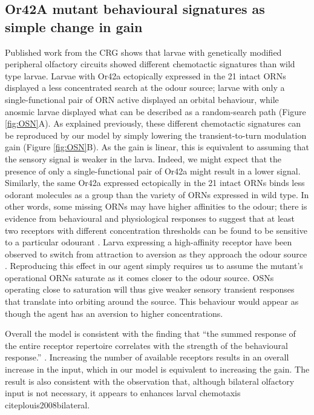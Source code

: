 \documentclass[11pt,a4paper]{article}
\begin{document}
\subsection{Or42A mutant behavioural signatures as simple change in gain}
Published work from the CRG shows that larvae with genetically modified peripheral olfactory circuits showed different chemotactic signatures than wild type larvae. Larvae with Or42a ectopically expressed in the 21 intact ORNs displayed a less concentrated search at the odour source; larvae with only a single-functional pair of ORN active displayed an orbital behaviour, while anosmic larvae displayed what can be described as a random-search path (Figure \ref{fig:OSN}A).
 As explained previously, these different chemotactic signatures can be reproduced by our model by simply lowering the transient-to-turn modulation gain 
 (Figure \ref{fig:OSN}B). As the gain is linear, this is equivalent to assuming that the sensory signal is weaker in the larva. Indeed, we might expect that the presence of only a single-functional pair of Or42a might result in a lower signal.
 Similarly, the same Or42a expressed ectopically in the 21 intact ORNs binds less odorant molecules as a group than the variety of ORNs expressed in wild type. In other words, some missing ORNs may have higher affinities to the odour; there is evidence from behavioural and physiological responses to suggest that at least two receptors with different concentration thresholds can be found to be sensitive to a particular odourant \citep{kreher2008translation}. 
 Larva expressing a high-affinity receptor have been observed to switch from attraction to aversion as they approach the odour source \citep{gomez2011active, kreher2008translation}. %
  Reproducing this effect in our agent simply requires us to assume the mutant's operational ORNs saturate as it comes closer to the odour source. OSNs operating close to saturation will thus give weaker sensory transient responses that translate into orbiting around the source. This behaviour would appear as though the agent has an aversion to higher concentrations.
 
 Overall the model is consistent with the finding that ``the summed response of the entire receptor repertoire correlates with the strength of the behavioural response.” \citep{kreher2008translation}. Increasing the number of available receptors results in an overall increase in the input, which in our model is equivalent to increasing the gain. The result is also consistent with the observation that, although bilateral olfactory input is not necessary, it appears to enhances larval chemotaxis citep{louis2008bilateral}.
\end{document}
